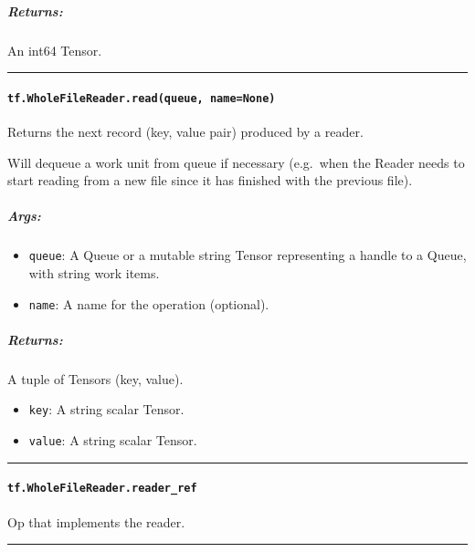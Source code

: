 \subparagraph{Returns: }\label{returns-14}

An int64 Tensor.

\begin{center}\rule{0.5\linewidth}{\linethickness}\end{center}

\paragraph{\texorpdfstring{\texttt{tf.WholeFileReader.read(queue,\ name=None)}
}{tf.WholeFileReader.read(queue, name=None) }}\label{tf.wholefilereader.readqueue-namenone}

Returns the next record (key, value pair) produced by a reader.

Will dequeue a work unit from queue if necessary (e.g.~when the Reader
needs to start reading from a new file since it has finished with the
previous file).

\subparagraph{Args: }\label{args-18}

\begin{itemize}
\tightlist
\item
  \texttt{queue}: A Queue or a mutable string Tensor representing a
  handle to a Queue, with string work items.
\item
  \texttt{name}: A name for the operation (optional).
\end{itemize}

\subparagraph{Returns: }\label{returns-15}

A tuple of Tensors (key, value).

\begin{itemize}
\tightlist
\item
  \texttt{key}: A string scalar Tensor.
\item
  \texttt{value}: A string scalar Tensor.
\end{itemize}

\begin{center}\rule{0.5\linewidth}{\linethickness}\end{center}

\paragraph{\texorpdfstring{\texttt{tf.WholeFileReader.reader\_ref}
}{tf.WholeFileReader.reader\_ref }}\label{tf.wholefilereader.readerux5fref}

Op that implements the reader.

\begin{center}\rule{0.5\linewidth}{\linethickness}\end{center}

